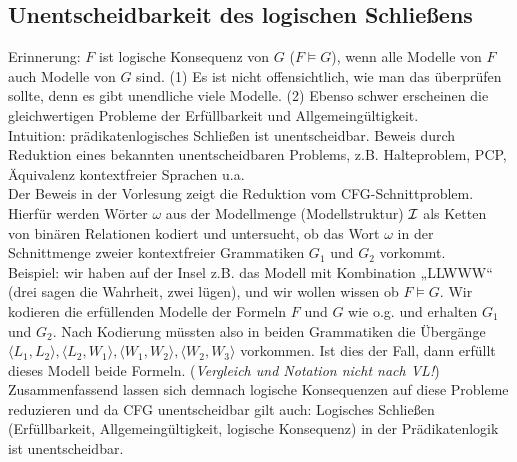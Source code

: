 \subsection{Unentscheidbarkeit des logischen Schließens}
    Erinnerung: $F$ ist logische Konsequenz von $G$ ($F\models G$), wenn alle Modelle von $F$ auch Modelle von $G$ sind. (1) Es ist nicht offensichtlich, wie man das überprüfen sollte, denn es gibt unendliche viele Modelle. (2) Ebenso schwer erscheinen die gleichwertigen Probleme der Erfüllbarkeit und Allgemeingültigkeit. \\

    Intuition: prädikatenlogisches Schließen ist unentscheidbar. Beweis durch Reduktion eines bekannten unentscheidbaren Problems, z.B. Halteproblem, PCP, Äquivalenz kontextfreier Sprachen u.a. \\

    Der Beweis in der Vorlesung zeigt die Reduktion vom CFG-Schnittproblem. Hierfür werden Wörter $\omega$ aus der Modellmenge (Modellstruktur) $\mathcal{I}$ als Ketten von binären Relationen kodiert und untersucht, ob das Wort $\omega$ in der Schnittmenge zweier kontextfreier Grammatiken $G_{1}$ und $G_{2}$ vorkommt. \\
    Beispiel: wir haben auf der Insel z.B. das Modell mit Kombination „LLWWW“ (drei sagen die Wahrheit, zwei lügen), und wir wollen wissen ob $F \models G$. Wir kodieren die erfüllenden Modelle der Formeln $F$ und $G$ wie o.g. und erhalten $G_{1}$ und $G_{2}$. Nach Kodierung müssten also in beiden Grammatiken die Übergänge $\langle L_{1},L_{2} \rangle, \langle L_{2},W_{1} \rangle, \langle W_{1},W_{2} \rangle, \langle W_{2},W_{3} \rangle$ vorkommen. Ist dies der Fall, dann erfüllt dieses Modell beide Formeln.  (\textit{Vergleich und Notation nicht nach VL!}) \\
    Zusammenfassend lassen sich demnach logische Konsequenzen auf diese Probleme reduzieren und da CFG unentscheidbar gilt auch: Logisches Schließen (Erfüllbarkeit, Allgemeingültigkeit, logische Konsequenz) in der Prädikatenlogik ist unentscheidbar. 

